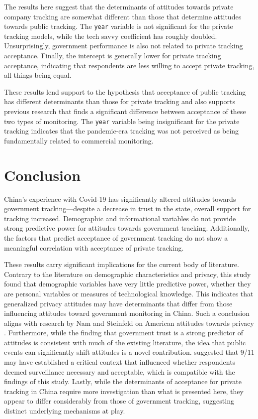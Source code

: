 \documentclass[
  number]{elsarticle}
\begin{document}
The results here suggest that the determinants of attitudes towards
private company tracking are somewhat different than those that
determine attitudes towards public tracking. The \texttt{year} variable
is not significant for the private tracking models, while the tech savvy
coefficient has roughly doubled. Unsurprisingly, government performance
is also not related to private tracking acceptance. Finally, the
intercept is generally lower for private tracking acceptance, indicating
that respondents are less willing to accept private tracking, all things
being equal.

These results lend support to the hypothesis that acceptance of public
tracking has different determinants than those for private tracking and
also supports previous research that finds a significant difference
between acceptance of these two types of monitoring. The \texttt{year}
variable being insignificant for the private tracking indicates that the
pandemic-era tracking was not perceived as being fundamentally related
to commercial monitoring.

\section{Conclusion}\label{sec-conclusion}

China's experience with Covid-19 has significantly altered attitudes
towards government tracking---despite a decrease in trust in the state,
overall support for tracking increased. Demographic and informational
variables do not provide strong predictive power for attitudes towards
government tracking. Additionally, the factors that predict acceptance
of government tracking do not show a meaningful correlation with
acceptance of private tracking.

These results carry significant implications for the current body of
literature. Contrary to the literature on demographic characteristics
and privacy, this study found that demographic variables have very
little predictive power, whether they are personal variables or measures
of technological knowledge. This indicates that generalized privacy
attitudes may have determinants that differ from those influencing
attitudes toward government monitoring in China. Such a conclusion
aligns with research by Nam and Steinfeld on American attitudes towards
privacy \citep{nam2019, steinfeld2017}. Furthermore, while the finding
that government trust is a strong predictor of attitudes is consistent
with much of the existing literature, the idea that public events can
significantly shift attitudes is a novel contribution. \citep{davis2004}
suggested that 9/11 may have established a critical context that
influenced whether respondents deemed surveillance necessary and
acceptable, which is compatible with the findings of this study. Lastly,
while the determinants of acceptance for private tracking in China
require more investigation than what is presented here, they appear to
differ considerably from those of government tracking, suggesting
distinct underlying mechanisms at play.
\end{document}
